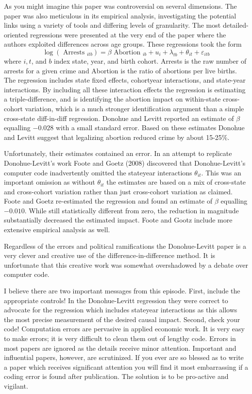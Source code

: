 \documentclass[10pt]{article}
\begin{document}
As you might imagine this paper was controversial on several dimensions. The paper was also meticulous in its empirical analysis, investigating the potential links using a variety of tools and differing levels of granularity. The most detailed-oriented regressions were presented at the very end of the paper where the authors exploited differences across age groups. These regressions took the form
$$
\log \left(\text { Arrests }_{i t b}\right)=\beta \text { Abortion }_{i b}+u_{i}+\lambda_{t b}+\theta_{i t}+\varepsilon_{i t b}
$$
where $i, t$, and $b$ index state, year, and birth cohort. Arrests is the raw number of arrests for a given crime and Abortion is the ratio of abortions per live births. The regression includes state fixed effects, cohortyear interactions, and state-year interactions. By including all these interaction effects the regression is estimating a triple-difference, and is identifying the abortion impact on within-state cross-cohort variation, which is a much stronger identification argument than a simple cross-state diff-in-diff regression. Donohue and Levitt reported an estimate of $\beta$ equalling $-0.028$ with a small standard error. Based on these estimates Donohue and Levitt suggest that legalizing abortion reduced crime by about 15-25\%.

Unfortunately, their estimates contained an error. In an attempt to replicate Donohue-Levitt's work Foote and Goetz (2008) discovered that Donohue-Levitt's computer code inadvertently omitted the stateyear interactions $\theta_{i t}$. This was an important omission as without $\theta_{i t}$ the estimates are based on a mix of cross-state and cross-cohort variation rather than just cross-cohort variation as claimed. Foote and Goetz re-estimated the regression and found an estimate of $\beta$ equalling $-0.010$. While still statistically different from zero, the reduction in magnitude substantially decreased the estimated impact. Foote and Gootz include more extensive empirical analysis as well.

Regardless of the errors and political ramifications the Donohue-Levitt paper is a very clever and creative use of the difference-in-difference method. It is unfortunate that this creative work was somewhat overshadowed by a debate over computer code.

I believe there are two important messages from this episode. First, include the appropriate controls! In the Donohue-Levitt regression they were correct to advocate for the regression which includes stateyear interactions as this allows the most precise measurement of the desired causal impact. Second, check your code! Computation errors are pervasive in applied economic work. It is very easy to make errors; it is very difficult to clean them out of lengthy code. Errors in most papers are ignored as the details receive minor attention. Important and influential papers, however, are scrutinized. If you ever are so blessed as to write a paper which receives significant attention you will find it most embarrassing if a coding error is found after publication. The solution is to be pro-active and vigilant.
\end{document}
